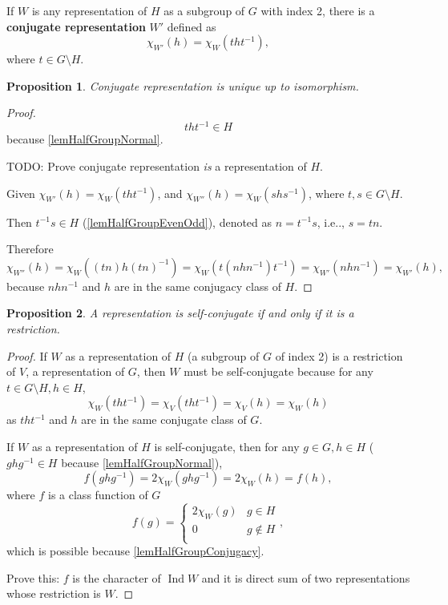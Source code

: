 \documentclass[12pt, letterpaper]{article}
\makeatletter
\newcommand{\Ind}{\operatorname{Ind}}
\newcommand\ie{i.e\@ifnextchar.{}{.\@}}
\newcommand{\red}[1]{{\color{red} #1}}
\newtheorem{prop}{Proposition}[section]
\theoremstyle{definition}
\theoremstyle{remark}
\theoremstyle{definition}
\theoremstyle{plain}
\numberwithin{equation}{section}
\makeatother
\begin{document}
	\begin{def*}
		If $W$ is any representation of $H$ as a subgroup of $G$ with index 2,
		there is a \textbf{conjugate representation} $W'$ defined as
		\[\chi_{W'}(h)=\chi_{W}(tht^{-1}), \]
		where $t\in G\setminus H$.
	\end{def*}
	\begin{prop}
		Conjugate representation is unique up to isomorphism.
	\end{prop}
	\begin{proof}
		\[tht^{-1}\in H \] because \autoref{lemHalfGroupNormal}.
		
		\red{TODO: Prove conjugate representation \textit{is} a representation of $H$.}
		
		Given $\chi_{W'}(h)=\chi_{W}(tht^{-1})$, and $\chi_{W''}(h)=\chi_{W}(shs^{-1})$,
		where $t,s\in G\setminus H$.
		
		Then $t^{-1}s\in H$ (\autoref{lemHalfGroupEvenOdd}), denoted as $n=t^{-1}s$, \ie, $s=tn$.
		
		Therefore
		\[\chi_{W''}(h)=\chi_{W}((tn)h(tn)^{-1})=\chi_{W}(t(nhn^{-1})t^{-1})=\chi_{W'}(nhn^{-1})=\chi_{W'}(h),\]
		because $nhn^{-1}$ and $h$ are in the same conjugacy class of $H$.
	\end{proof}
	\begin{prop}\label{lemSelfConjugateRestriction}
		A representation is self-conjugate if and only if it is a restriction.
	\end{prop}
	\begin{proof}
		If $W$ as a representation of $H$ (a subgroup of $G$ of index 2)
		is a restriction of $V$, a representation of $G$, then
		$W$ must be self-conjugate because for any $t\in G\setminus H,h\in H$,
		\[\chi_W(tht^{-1})=\chi_V(tht^{-1})=\chi_V(h)=\chi_W(h)\]
		as $tht^{-1}$ and $h$ are in the same conjugate class of $G$.

		If $W$ as a representation of $H$ is self-conjugate,
		then for any $g\in G,h\in H$ ($ghg^{-1}\in H $ because \autoref{lemHalfGroupNormal}),
		\[f(ghg^{-1})=2\chi_W(ghg^{-1})=2\chi_W(h)=f(h),\]
		where $f$ is a class function of $G$
		\[ f(g)=\begin{cases}
			2\chi_W(g)&g\in H\\
			0& g\notin H\\
		\end{cases}, \]
		which is possible because \autoref{lemHalfGroupConjugacy}.
		
		\red{Prove this: $f$ is the character of $\Ind W$ and it is direct sum of two representations whose restriction
		is $W$.}
	\end{proof}
\end{document}
